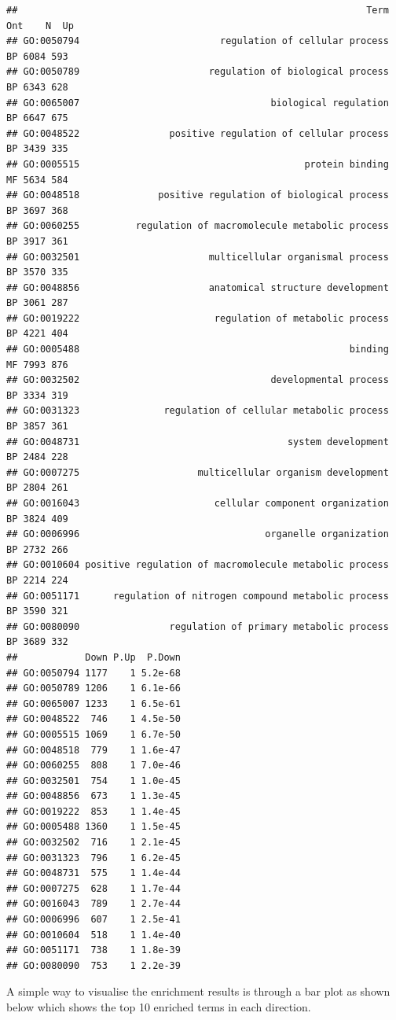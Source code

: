 \documentclass[]{book}
\begin{document}
\begin{verbatim}
##                                                              Term Ont    N  Up
## GO:0050794                         regulation of cellular process  BP 6084 593
## GO:0050789                       regulation of biological process  BP 6343 628
## GO:0065007                                  biological regulation  BP 6647 675
## GO:0048522                positive regulation of cellular process  BP 3439 335
## GO:0005515                                        protein binding  MF 5634 584
## GO:0048518              positive regulation of biological process  BP 3697 368
## GO:0060255          regulation of macromolecule metabolic process  BP 3917 361
## GO:0032501                       multicellular organismal process  BP 3570 335
## GO:0048856                       anatomical structure development  BP 3061 287
## GO:0019222                        regulation of metabolic process  BP 4221 404
## GO:0005488                                                binding  MF 7993 876
## GO:0032502                                  developmental process  BP 3334 319
## GO:0031323               regulation of cellular metabolic process  BP 3857 361
## GO:0048731                                     system development  BP 2484 228
## GO:0007275                     multicellular organism development  BP 2804 261
## GO:0016043                        cellular component organization  BP 3824 409
## GO:0006996                                 organelle organization  BP 2732 266
## GO:0010604 positive regulation of macromolecule metabolic process  BP 2214 224
## GO:0051171      regulation of nitrogen compound metabolic process  BP 3590 321
## GO:0080090                regulation of primary metabolic process  BP 3689 332
##            Down P.Up  P.Down
## GO:0050794 1177    1 5.2e-68
## GO:0050789 1206    1 6.1e-66
## GO:0065007 1233    1 6.5e-61
## GO:0048522  746    1 4.5e-50
## GO:0005515 1069    1 6.7e-50
## GO:0048518  779    1 1.6e-47
## GO:0060255  808    1 7.0e-46
## GO:0032501  754    1 1.0e-45
## GO:0048856  673    1 1.3e-45
## GO:0019222  853    1 1.4e-45
## GO:0005488 1360    1 1.5e-45
## GO:0032502  716    1 2.1e-45
## GO:0031323  796    1 6.2e-45
## GO:0048731  575    1 1.4e-44
## GO:0007275  628    1 1.7e-44
## GO:0016043  789    1 2.7e-44
## GO:0006996  607    1 2.5e-41
## GO:0010604  518    1 1.4e-40
## GO:0051171  738    1 1.8e-39
## GO:0080090  753    1 2.2e-39
\end{verbatim}

A simple way to visualise the enrichment results is through a bar plot as shown below which shows the top 10 enriched terms in each direction.
\end{document}
